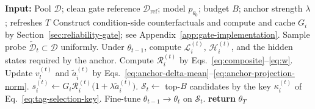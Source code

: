\begin{algorithm}[t]
  \caption{\textsc{TAG}: reliability-gated training-adaptive selection}
  \label{alg:tag}
  \begin{algorithmic}[1]
  \STATE \textbf{Input:} Pool $\mathcal D$; clean gate reference $\mathcal D_{\mathrm{ref}}$; model $p_{\theta_0}$; budget $B$; anchor strength $\lambda$; refreshes $T$
  \STATE Construct condition-side counterfactuals and compute and cache $G_i$ by Section~\ref{sec:reliability-gate}; see Appendix~\ref{app:gate-implementation}.
    \STATE Sample probe $\widetilde{\mathcal D}_t\subset\mathcal D$ uniformly.
    \STATE Under $\theta_{t-1}$, compute $\mathcal L_i^{(t)}$, $\mathcal H_i^{(t)}$, and the hidden states required by the anchor.
    \STATE Compute $\mathcal R_i^{(t)}$ by Eqs.~\eqref{eq:composite}--\eqref{eq:w}.
    \STATE Update $v_l^{(t)}$ and $\widetilde a_i^{(t)}$ by Eqs.~\eqref{eq:anchor-delta-mean}--\eqref{eq:anchor-projection-norm}.
    \STATE $s_i^{(t)}\gets G_i\mathcal R_i^{(t)}\bigl(1+\lambda\widetilde a_i^{(t)}\bigr)$.
    \STATE $\mathcal S_t\gets$ top-$B$ candidates by the key $\kappa_i^{(t)}$ of Eq.~\eqref{eq:tag-selection-key}.
    \STATE Fine-tune $\theta_{t-1}\to\theta_t$ on $\mathcal S_t$.
  \ENDFOR
  \STATE \textbf{return} $\theta_T$
  \end{algorithmic}
\end{algorithm}
